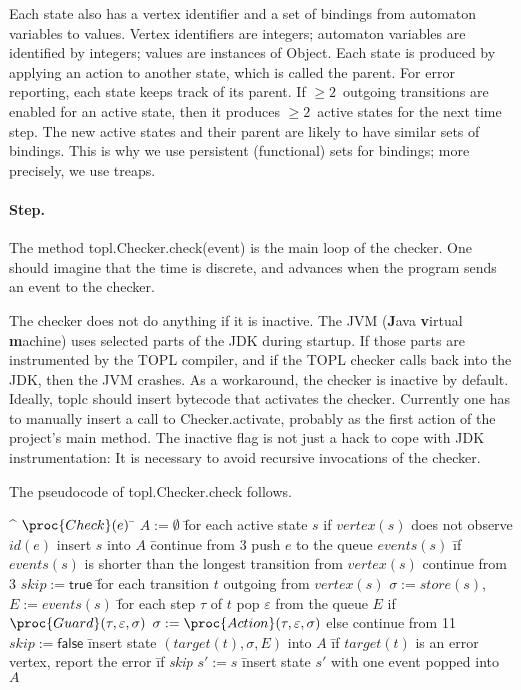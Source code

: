 \documentclass{article} %
\begin{document}
Each state also has a vertex identifier and a set of bindings from automaton variables to values.
Vertex identifiers are integers; automaton variables are identified by integers; values are instances of \textsf{Object}.
Each state is produced by applying an action to another state, which is called the parent.
For error reporting, each state keeps track of its parent.
If $\ge2$~outgoing transitions are enabled for an active state, then it produces $\ge2$~active states for the next time step.
The new active states and their parent are likely to have similar sets of bindings.
This is why we use persistent (functional) sets for bindings; more precisely, we use treaps.

\paragraph{Step.}
The method \textsf{topl.Checker.check(event)} is the main loop of the checker.
One should imagine that the time is discrete, and advances when the program sends an event to the checker.

The checker does not do anything if it is inactive.
The JVM (\textbf Java \textbf virtual \textbf machine) uses selected parts of the JDK during startup.
If those parts are instrumented by the TOPL compiler, and if the TOPL checker calls back into the JDK, then the JVM crashes.
As a workaround, the checker is inactive by default.
Ideally, \textsf{toplc} should insert bytecode that activates the checker.
Currently one has to manually insert a call to \textsf{Checker.activate}, probably as the first action of the project's \textsf{main} method.
The inactive flag is not just a hack to cope with JDK instrumentation:
It is necessary to avoid recursive invocations of the checker.

The pseudocode of \textsf{topl.Checker.check} follows.

\begin{alg}
\^  $\proc{Check}(e)$
\=  $A := \emptyset$
\=  for each active state $s$
\+    if $\mathit{vertex}(s)$ does not observe $\mathit{id}(e)$
\+      insert $s$ into $A$
\=      continue from $3$
\-    push $e$ to the queue $\mathit{events}(s)$
\=    if $\mathit{events}(s)$ is shorter than the longest transition from $\mathit{vertex}(s)$
\+      continue from $3$
\1    $\mathit{skip}:=\mathsf{true}$
\=    for each transition $t$ outgoing from $\mathit{vertex}(s)$
\+      $\sigma := \mathit{store}(s)$,\quad $E := \mathit{events}(s)$
\=      for each step $\tau$ of $t$
\+        pop $\varepsilon$ from the queue $E$
\+        if $\proc{Guard}(\tau, \varepsilon, \sigma)$
\+          $\sigma := \proc{Action}(\tau, \varepsilon, \sigma)$
\-        else
\+          continue from 11
\2      $\mathit{skip}:=\mathsf{false}$
\=      insert state $(\mathit{target}(t), \sigma, E)$ into $A$
\=      if $\mathit{target}(t)$ is an error vertex, report the error
\=      if \textit{skip}
\+        $s' := s$
\=        insert state $s'$ with one event popped into $A$
\end{alg}
\end{document}
